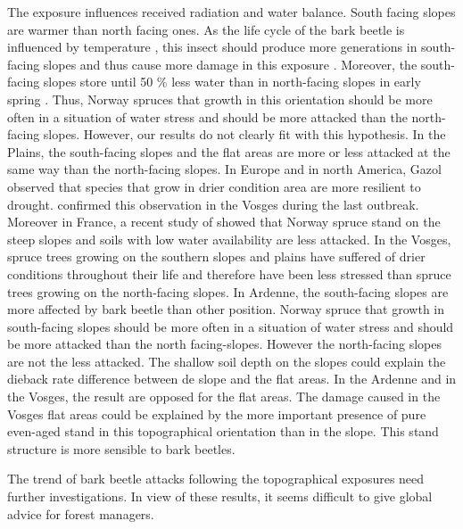 \documentclass[3p,procedia]{elsarticle}
\begin{document}
The exposure  influences received radiation and water balance.
South facing slopes are warmer than north facing ones.
As the life cycle of the bark beetle is influenced by temperature \citep{baier_phenipscomprehensive_2007},
this insect should produce more generations in south-facing slopes and thus cause  more damage in this exposure \citep{jakus_1995}.
Moreover, the south-facing slopes store until 50 \% less water than in north-facing slopes in early spring \citep{Rouse_1969}.
Thus, Norway spruces that growth in this orientation should be more often in a situation of water stress and should be more attacked than the north-facing slopes.
However, our results do not  clearly fit with this hypothesis. In the Plains, the south-facing slopes and the flat areas are more or less attacked at the same way than the north-facing slopes. In Europe and in north America, Gazol \citep{gazol_2017} observed that species that grow in drier condition area are more resilient to drought.
 \cite{piedallu_spatial_2022} confirmed this observation in the Vosges during the last outbreak.
Moreover in France, a recent study of \cite{nardi_drought_2022} showed that Norway spruce stand on the steep slopes and soils with low water availability are less attacked.
In the Vosges, spruce trees growing on the southern slopes and plains have suffered of drier conditions throughout their life and therefore have been less stressed than spruce trees growing on the north-facing slopes.
In Ardenne, the south-facing slopes are more affected by bark beetle than other position.
Norway spruce that growth in south-facing slopes should be more often in a situation of water stress and should be more attacked than the north facing-slopes.
However the north-facing slopes are not the less attacked. 
The shallow soil depth on the slopes could explain the dieback rate difference between de slope and the flat areas. 
In the Ardenne and in the Vosges, the result are opposed for the flat areas.
The damage caused in the Vosges flat areas  could be explained by the more important presence of pure even-aged stand in this topographical orientation than in the slope.
This stand structure is more sensible to bark beetles.

The trend of bark beetle attacks following the topographical exposures need further investigations.
In view of these results, it seems difficult to give global advice for forest managers.
\end{document}
